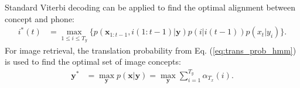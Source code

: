 \documentclass[journal]{IEEEtran}
\begin{document}


Standard Viterbi decoding can be applied to find the optimal alignment between concept and phone: 
\begin{align}\label{hmm_alignment}
    i^*(t) &= \max_{1 \leq i \leq T_y}\{p(\mathbf x_{1:t-1}, i(1:t-1)|\mathbf y) p(i|i(t-1))p(x_t|y_i)\}.
\end{align}
For image retrieval, the translation probability from Eq. (\ref{eq:trans_prob_hmm}) is used to find the optimal set of image concepts:
\begin{align*}
    \mathbf y^* &= \max_{\mathbf y} p(\mathbf x|\mathbf y) = \max_{\mathbf y} \sum_{i=1}^{T_y}\alpha_{T_x}(i).
\end{align*}
\end{document}
